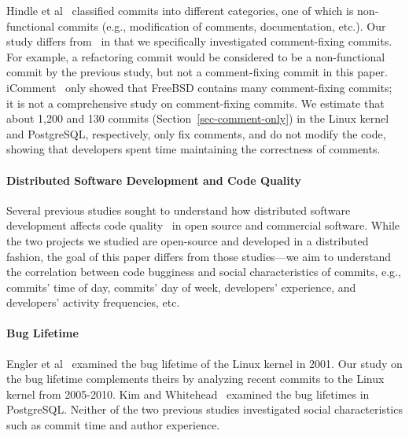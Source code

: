 Hindle et al~\cite{largeCommits} classified commits into different categories,
one of which is non-functional commits (e.g., modification of comments,
documentation, etc.).  Our study differs from~\cite{largeCommits} in that we
specifically investigated comment-fixing commits. For example, a refactoring
commit would be considered to be a non-functional commit by the previous study,
but not a comment-fixing commit in this paper. iComment~\cite{iComment} only
showed that FreeBSD contains many comment-fixing commits; it is not a
comprehensive study on comment-fixing commits.  We estimate that about 1,200 and
130 commits (Section~\ref{sec-comment-only}) in the Linux kernel and PostgreSQL,
respectively, only fix comments, and do not modify the code, showing that
developers spent time maintaining the correctness of comments.

\paragraph{Distributed Software Development and Code Quality}

Several previous studies sought to understand how distributed software
development affects code quality~\cite{distributed09, organizational08,
  global06} in open source and commercial software. While the two projects we studied are open-source and developed in a distributed fashion, the
goal of this paper differs from those studies---we aim to understand
the correlation between code bugginess and social characteristics of commits,
e.g., commits' time of day, commits' day of week, developers' experience, and
developers' activity frequencies, etc.

\vspace{3em}

\paragraph{Bug Lifetime}

Engler et al~\cite{deviant} examined the bug lifetime of the Linux kernel in
2001. Our study on the bug lifetime complements theirs by analyzing recent
commits to the Linux kernel from 2005-2010.  Kim and Whitehead~\cite{2006-long}
examined the bug lifetimes in PostgreSQL.  Neither of the two previous studies
investigated social characteristics such as commit time and author experience.


